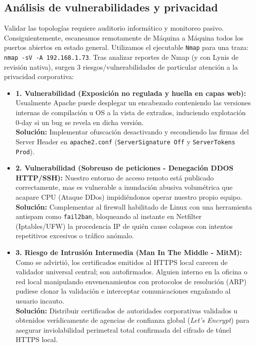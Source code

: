 \documentclass[12pt,a4paper]{report}
\begin{document}
\subsection{Análisis de vulnerabilidades y privacidad}
Validar las topologías requiere auditorio informático y monitoreo pasivo. Consiguientemente, escaneamos remotamente de Máquina a Máquina todos los puertos abiertos en estado general. Utilizamos el ejecutable \texttt{Nmap} para una traza: \texttt{nmap -sV -A 192.168.1.73}. Tras analizar reportes de Nmap (y con Lynis de revisión nativa), surgen 3 riesgos/vulnerabilidades de particular atención a la privacidad corporativa:

\begin{itemize}
    \item \textbf{1. Vulnerabilidad (Exposición no regulada y huella en capas web):} Usualmente Apache puede desplegar un encabezado conteniendo las versiones internas de compilación u OS a la vista de extraños, induciendo explotación 0-day si un bug se revela en dicha versión. \\ \textbf{Solución:} Implementar ofuscación desactivando y escondiendo las firmas del Server Header en \texttt{apache2.conf} (\texttt{ServerSignature Off} y \texttt{ServerTokens Prod}).
    \item \textbf{2. Vulnerabilidad (Sobreuso de peticiones - Denegación DDOS HTTP/SSH):} Nuestro entorno de acceso remoto está publicado correctamente, mas es vulnerable a inundación abusiva volumétrica que acapare CPU (Ataque DDos) impidiéndonos operar nuestro propio equipo. \\ \textbf{Solución:} Complementar al firewall habilitado de Linux con una herramienta antispam como \texttt{fail2ban}, bloqueando al instante en Netfilter (Iptables/UFW) la procedencia IP de quién cause colapsos con intentos repetitivos excesivos o tráfico anómalo.
    \item \textbf{3. Riesgo de Intrusión Intermedia (Man In The Middle - MitM):} Como se advirtió, los certificados emitidos al HTTPS local carecen de validador universal central; son autofirmados. Alguien interno en la oficina o red local manipulando envenenamientos con protocolos de resolución (ARP) pudiese clonar la validación e interceptar comunicaciones engañando al usuario incauto. \\ \textbf{Solución:} Distribuir certificados de autoridades corporativas validados u obtenidos verídicamente de agencias de confianza global (\textit{Let's Encrypt}) para asegurar inviolabilidad perimetral total confirmada del cifrado de túnel HTTPS local.
\end{itemize}
\end{document}

